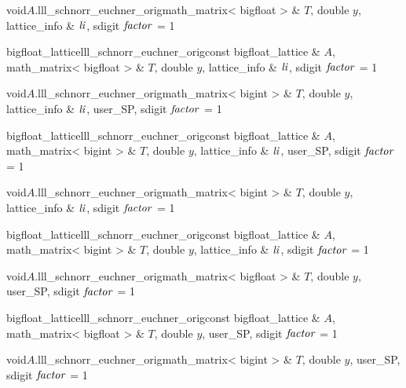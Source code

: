 \begin{fcode}{void}{$A$.lll_schnorr_euchner_orig}{math_matrix< bigfloat > & $T$, double $y$,
    lattice_info & $\mathit{li}$, sdigit $\mathit{factor}$ = 1}%
\end{fcode}

\begin{fcode}{bigfloat_lattice}{lll_schnorr_euchner_orig}{const bigfloat_lattice & $A$,
    math_matrix< bigfloat > & $T$, double $y$, lattice_info & $\mathit{li}$, sdigit $\mathit{factor}$ = 1}%
\end{fcode}

\begin{fcode}{void}{$A$.lll_schnorr_euchner_orig}{math_matrix< bigint > & $T$, double $y$,
    lattice_info & $\mathit{li}$, user_SP, sdigit $\mathit{factor}$ = 1}%
\end{fcode}

\begin{fcode}{bigfloat_lattice}{lll_schnorr_euchner_orig}{const bigfloat_lattice & $A$,
    math_matrix< bigint > & $T$, double $y$, lattice_info & $\mathit{li}$, user_SP, sdigit $\mathit{factor}$ = 1}%
\end{fcode}

\begin{fcode}{void}{$A$.lll_schnorr_euchner_orig}{math_matrix< bigint > & $T$, double $y$,
    lattice_info & $\mathit{li}$, sdigit $\mathit{factor}$ = 1}%
\end{fcode}

\begin{fcode}{bigfloat_lattice}{lll_schnorr_euchner_orig}{const bigfloat_lattice & $A$,
    math_matrix< bigint > & $T$, double $y$, lattice_info & $\mathit{li}$, sdigit $\mathit{factor}$ = 1}%
\end{fcode}

\begin{fcode}{void}{$A$.lll_schnorr_euchner_orig}{math_matrix< bigfloat > & $T$, double $y$,
    user_SP, sdigit $\mathit{factor}$ = 1}%
\end{fcode}

\begin{fcode}{bigfloat_lattice}{lll_schnorr_euchner_orig}{const bigfloat_lattice & $A$,
    math_matrix< bigfloat > & $T$, double $y$, user_SP, sdigit $\mathit{factor}$ = 1}%
\end{fcode}

\begin{fcode}{void}{$A$.lll_schnorr_euchner_orig}{math_matrix< bigint > & $T$, double $y$,
    user_SP, sdigit $\mathit{factor}$ = 1}%
\end{fcode}

